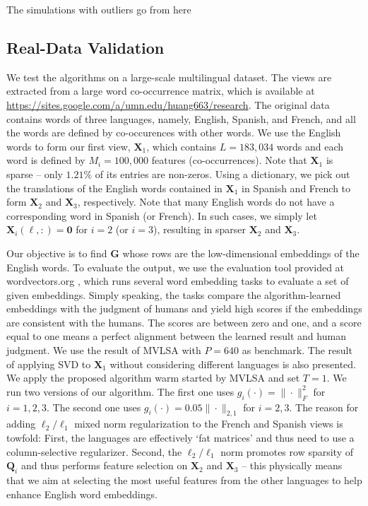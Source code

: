 \documentclass[10pt,journal]{IEEEtran}
\def\blue{\color{blue}}
\newcommand{\Q}{\boldsymbol{Q}}
\newcommand{\X}{\boldsymbol{X}}
\begin{document}
{\blue The simulations with outliers go from here}


\subsection{Real-Data Validation}
We test the algorithms on a large-scale multilingual dataset.
The views are extracted from a large word co-occurrence matrix, which is available at \url{https://sites.google.com/a/umn.edu/huang663/research}.
The original data contains words of three languages, namely, English, Spanish, and French,
and all the words are defined by co-occurences with other words.
We use the English words to form our first view, ${\bm X}_1$, which contains $L=183,034$ words and each word is defined by $M_i=100,000$ features (co-occurrences). Note that ${\bm X}_1$ is sparse -- only $1.21\%$ of its entries are non-zeros.
Using a dictionary, we pick out the translations of the English words contained in ${\bm X}_1$ in Spanish and French to form ${\bm X}_2$ and ${\bm X}_3$, respectively.
Note that many English words do not have a corresponding word in Spanish (or French).
In such cases, we simply let ${\bm X}_i(\ell,:)={\bm 0}$ for $i=2$ (or $i=3$),
resulting in sparser ${\bm X}_2$ and ${\bm X}_3$.


Our objective is to find ${\bm G}$ whose rows are the low-dimensional embeddings of the English words.
To evaluate the output, we use the evaluation tool provided at {wordvectors.org} \cite{faruqui-2014:SystemDemo}, which runs several word embedding tasks to evaluate a set of given embeddings. Simply speaking, the tasks compare the algorithm-learned
embeddings with the judgment of humans and yield high scores if the embeddings are consistent with the humans. The scores are between zero and one,
and a score equal to one means a perfect alignment between the learned result and human judgment.
We use the result of MVLSA with $P=640$ as benchmark. 
The result of applying SVD to ${\bm X}_1$ without considering different languages is also presented.
We apply the proposed algorithm warm started by MVLSA and set $T=1$.
We run two versions of our algorithm. The first one uses $g_i(\cdot)=\|\cdot\|_F^2$
for $i=1,2,3$.
The second one uses $g_i(\cdot)=0.05\|\cdot\|_{2,1}$ for $i=2,3$.
The reason for adding $\ell_2/\ell_1$ mixed norm regularization to the French and Spanish views
is towfold:
First, the languages are effectively `fat matrices' and thus need to use a column-selective regularizer.
Second, the $\ell_2/\ell_1$ norm promotes row sparsity of $\Q_i$ and thus performs feature selection on $\X_2$ and $\X_3$ -- this physically means that we aim at selecting the most useful features from the other languages to help enhance English word embeddings.
\end{document}
